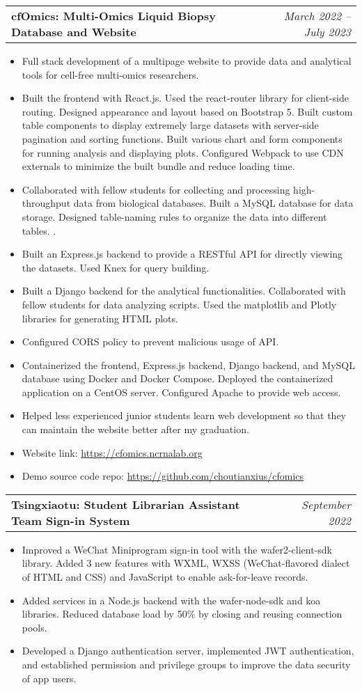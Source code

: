 \documentclass[letterpaper,11pt]{article}
\makeatletter
\newcommand{\resumeItem}[2]{
  \item\small{
    \textbf{#1}{: #2 \vspace{-2pt}}
  }
}
\newcommand{\customItem}[1]{
	\item
		\small{#1\vspace{-2pt}}
}
\newcommand{\customHeading}[2]{
  \vspace{-1pt}\item
    \begin{tabular*}{0.97\textwidth}{l@{\extracolsep{\fill}}r}
      \textbf{#1} & \textit{\small #2} \\
    \end{tabular*}\vspace{-5pt}
}
\newcommand{\resumeItemListStart}{\begin{itemize}}
\newcommand{\resumeItemListEnd}{\end{itemize}\vspace{-5pt}}
\makeatother
\begin{document}
    \customHeading{cfOmics: Multi-Omics Liquid Biopsy Database and Website}{March 2022 -- July 2023}
      \resumeItemListStart
	\customItem{Full stack development of a multipage website to provide data and analytical tools for cell-free multi-omics researchers.}         
	\customItem{Built the frontend with React.js. Used the react-router library for client-side routing. Designed appearance and layout based on Bootstrap 5. Built custom table components to display extremely large datasets with server-side pagination and sorting functions. Built various chart and form components for running analysis and displaying plots. Configured Webpack to use CDN externals to minimize the built bundle and reduce loading time.}
	\customItem{Collaborated with fellow students for collecting and processing high-throughput data from biological databases. Built a MySQL database for data storage. Designed table-naming rules to organize the data into different tables.}.
	\customItem{Built an Express.js backend to provide a RESTful API for directly viewing the datasets. Used Knex for query building.}
	\customItem{Built a Django backend for the analytical functionalities. Collaborated with fellow students for data analyzing scripts. Used the matplotlib and Plotly libraries for generating HTML plots.}
	\customItem{Configured CORS policy to prevent malicious usage of API.}
	\customItem{Containerized the frontend, Express.js backend, Django backend, and MySQL database using Docker and Docker Compose. Deployed the containerized application on a CentOS server. Configured Apache to provide web access.}
	\customItem{Helped less experienced junior students learn web development so that they can maintain the website better after my graduation.}
	\customItem{Website link: \href{https://cfomics.ncrnalab.org}{https://cfomics.ncrnalab.org}}
	\customItem{Demo source code repo: \href{https://github.com/choutianxius/cfomics}{https://github.com/choutianxius/cfomics}}
\resumeItemListEnd



	\customHeading{Tsingxiaotu: Student Librarian Assistant Team Sign-in System}{September 2022}
	\resumeItemListStart
		\customItem{Improved a WeChat Miniprogram sign-in tool with the wafer2-client-sdk library. Added 3 new features with WXML, WXSS (WeChat-flavored dialect of HTML and CSS) and JavaScript to enable ask-for-leave records.}
		\customItem{Added services in a Node.js backend with the wafer-node-sdk and koa libraries. Reduced database load by 50\% by closing and reusing connection pools.}
		\customItem{Developed a Django authentication server, implemented JWT authentication, and established permission and privilege groups to improve the data security of app users.}
	\resumeItemListEnd
\end{document}
